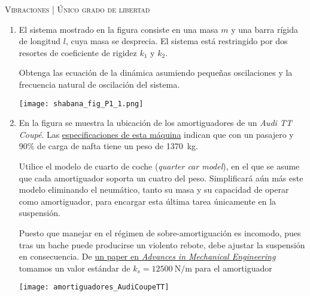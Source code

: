 \documentclass[11pt, spanish, a4paper, twopage]{article}
\begin{document}
\begin{center}
	\textsc{\large Vibraciones | Único grado de libertad}
\end{center}


\begin{enumerate}

				
\item 
\begin{minipage}[t][4cm]{0.65\textwidth}
El sistema mostrado en la figura consiste en una masa $m$ y una barra rígida de longitud $l$, cuya masa se desprecia.
El sistema está restringido por dos resortes de coeficiente de rigidez $k_1$ y $k_2$.

Obtenga las ecuación de la dinámica asumiendo pequeñas oscilaciones y la frecuencia natural de oscilación del sistema.
\end{minipage}
\begin{minipage}[c][3cm][t]{0.3\textwidth}
	\texttt{[image: shabana\_fig\_P1\_1.png]}
\end{minipage}



\item 
\begin{minipage}[t][6cm]{0.65\textwidth}
En la figura se muestra la ubicación de los amortiguadores de un \emph{Audi TT Coupé}.
Las \href{https://www.audi.de/de/brand/de/neuwagen/tt/tt-coupe.html#layer=/de/brand/de/neuwagen/tt/tt-coupe.engine_compare.fvp09g_0.techdata.html}{especificaciones de esta máquina} indican que con un pasajero y 90\% de carga de nafta tiene un peso de \SI{1370}{\kilo\gram}.

Utilice el modelo de cuarto de coche (\emph{quarter car model}), en el que se asume que cada amortiguador soporta un cuatro del peso.
Simplificará aún más este modelo eliminando el neumático, tanto su masa y su capacidad de operar como amortiguador, para encargar esta última tarea únicamente en la suspensión.

Puesto que manejar en el régimen de sobre-amortiguación es incomodo, pues tras un bache puede producirse un violento rebote, debe ajustar la suspensión en consecuencia.
De \href{https://journals.sagepub.com/doi/pdf/10.1177/1687814016648638}{un paper en \emph{Advances in Mechanical Engineering}} tomamos un valor estándar de $k_s = \SI{12500}{\newton\per\metre}$ para el amortiguador
\end{minipage}
\begin{minipage}[c][0cm][t]{0.3\textwidth}
	\texttt{[image: amortiguadores\_AudiCoupeTT]}
\end{minipage}




\end{enumerate}
\end{document}
